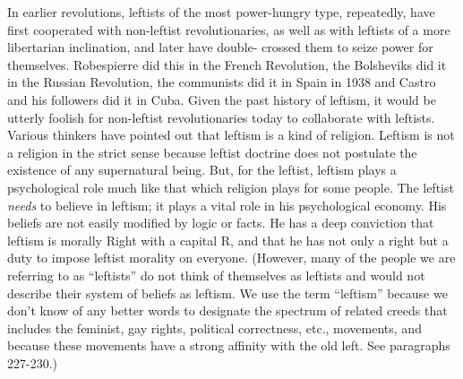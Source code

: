  In earlier revolutions, leftists of the most power-hungry type, repeatedly, have first cooperated with non-leftist revolutionaries, as well as with leftists of a more libertarian inclination, and later have double- crossed them to seize power for themselves. Robespierre did this in the French Revolution, the Bolsheviks did it in the Russian Revolution, the communists did it in Spain in 1938 and Castro and his followers did it in Cuba. Given the past history of leftism, it would be utterly foolish for non-leftist revolutionaries today to collaborate with leftists.
 Various thinkers have pointed out that leftism is a kind of religion. Leftism is not a religion in the strict sense because leftist doctrine does not postulate the existence of any supernatural being. But, for the leftist, leftism plays a psychological role much like that which religion plays for some people. The leftist {\em needs} to believe in leftism; it plays a vital role in his psychological economy. His beliefs are not easily modified by logic or facts. He has a deep conviction that leftism is morally Right with a capital R, and that he has not only a right but a duty to impose leftist morality on everyone. (However, many of the people we are referring to as “leftists” do not think of themselves as leftists and would not describe their system of beliefs as leftism. We use the term “leftism” because we don’t know of any better words to designate the spectrum of related creeds that includes the feminist, gay rights, political correctness, etc., movements, and because these movements have a strong affinity with the old left. See paragraphs 227-230.)\break
